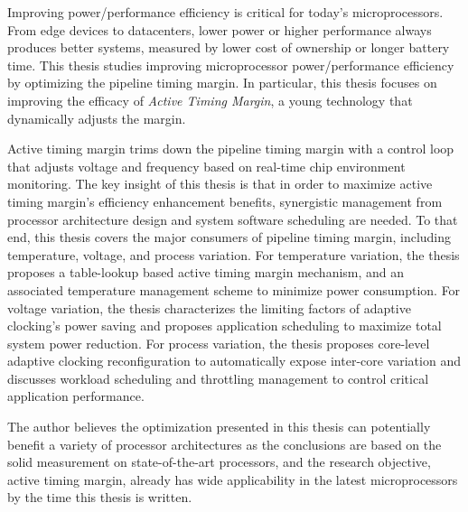 
%
\utabstract
\indent

Improving power/performance efficiency is critical for today's microprocessors. From edge devices to datacenters, lower power or higher performance always produces better systems, measured by lower cost of ownership or longer battery time. This thesis studies improving microprocessor power/performance efficiency by optimizing the pipeline timing margin. In particular, this thesis focuses on improving the efficacy of \textit{Active Timing Margin}, a young technology that dynamically adjusts the margin.

Active timing margin trims down the pipeline timing margin with a control loop that adjusts voltage and frequency based on real-time chip environment monitoring. The key insight of this thesis is that in order to maximize active timing margin's efficiency enhancement benefits, synergistic management from processor architecture design and system software scheduling are needed. To that end, this thesis covers the major consumers of pipeline timing margin, including temperature, voltage, and process variation. For temperature variation, the thesis proposes a table-lookup based active timing margin mechanism, and an associated temperature management scheme to minimize power consumption. For voltage variation, the thesis characterizes the limiting factors of adaptive clocking's power saving and proposes application scheduling to maximize total system power reduction. For process variation, the thesis proposes core-level adaptive clocking reconfiguration to automatically expose inter-core variation and discusses workload scheduling and throttling management to control critical application performance. 

The author believes the optimization presented in this thesis can potentially benefit a variety of processor architectures as the conclusions are based on the solid measurement on state-of-the-art processors, and the research objective, active timing margin, already has wide applicability in the latest microprocessors by the time this thesis is written.



